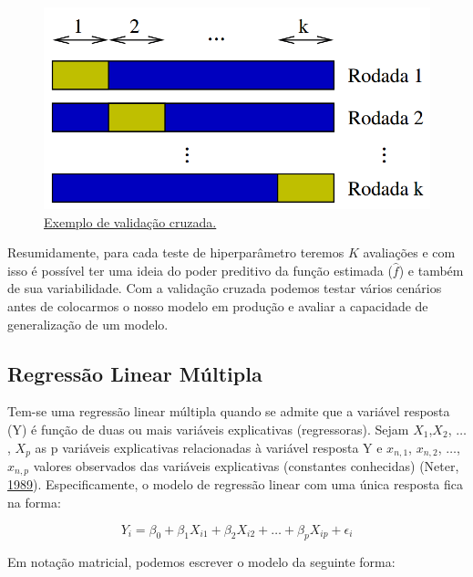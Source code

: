 \documentclass[
	12pt,				%
	a4paper,		%
	oneside,    %
	chapter=TITLE,		   %
	section=TITLE,		   %
	subsection=TITLE,	   %
	subsubsection=TITLE, %
	english,			%
	french,				%
	spanish,			%
	brazil,				%
]{abntex2}
\begin{document}
\begin{figure}
\centering
\includegraphics[width=\textwidth,height=0.4\textheight]{../fig/kfold.png}
\caption{\href{https://pt.stackoverflow.com/questions/66777/d\%C3\%BAvidas-na-utiliza\%C3\%A7\%C3\%A3o-de-stratified-k-fold-no-scikit-learn}{Exemplo
de validação cruzada.\label{img:kfold}}}
\end{figure}

Resumidamente, para cada teste de hiperparâmetro teremos \(K\)
avaliações e com isso é possível ter uma ideia do poder preditivo da
função estimada (\(\hat{f}\)) e também de sua variabilidade. Com a
validação cruzada podemos testar vários cenários antes de colocarmos o
nosso modelo em produção e avaliar a capacidade de generalização de um
modelo.

\hypertarget{regressuxe3o-linear-muxfaltipla}{%
\subsection{Regressão Linear
Múltipla}\label{regressuxe3o-linear-muxfaltipla}}

Tem-se uma regressão linear múltipla quando se admite que a variável
resposta (Y) é função de duas ou mais variáveis explicativas
(regressoras). Sejam \(X_1\),\(X_2\), \(\dots\) , \(X_p\) as p variáveis
explicativas relacionadas à variável resposta Y e \(x_{n,1}\),
\(x_{n,2}\), \(\dots\), \(x_{n,p}\) valores observados das variáveis
explicativas (constantes conhecidas) (Neter,
\protect\hyperlink{ref-neter1989applied}{1989}). Especificamente, o
modelo de regressão linear com uma única resposta fica na forma:

\[
Y_i = \beta_0 + \beta_1 X_{i1} + \beta_2 X_{i2}+\dots + \beta_p X_{ip} + \epsilon_i
\]

Em notação matricial, podemos escrever o modelo da seguinte forma:
\end{document}

